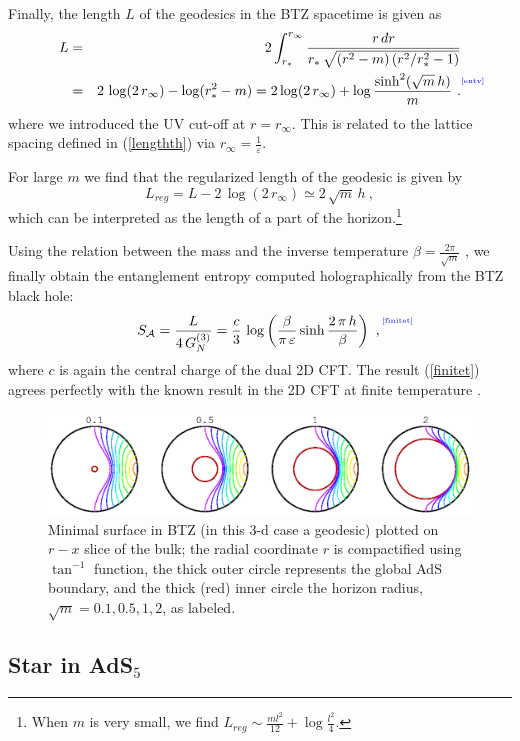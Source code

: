 \documentclass[12pt]{article}
\newcommand{\be}{\begin{equation}}
\newcommand{\ee}{\end{equation}}
\def\req#1{(\ref{#1})}
\def\veps{\varepsilon}
\def\s{\sigma}
\def\CA{{\cal A}}
\def\f#1#2{{\frac{#1}{#2}}}
\def\f#1#2{{\frac{#1}{#2}}}
\def\Label#1{\label{#1}%
{ \color{blue}{\smash{\hbox to0pt{\raise2ex\hbox{\tiny[#1]}\hss}}}}}
\def\rA{\CA}
\def\cof{{\veps}}
\def\s{\sqrt}
\def\f {\frac}
\def\no{\nonumber \\}
\def\ba{\begin{eqnarray}}
\def\ea{\end{eqnarray}}
\begin{document}
Finally, the length $L$ of the geodesics in the BTZ spacetime is given as
%
 \ba
L&=&2\int^{r_{\infty}}_{r_*}\f{r\, dr}{r_*\, \s{(r^2-m)\, (r^2/r^2_{*}-1)}}
\no
&=&2 \, \log(2\, r_\infty)
-\log(r^2_*-m) =2\log(2\, r_\infty)+\log\f{\sinh^2(\s{m}\, h)}{m} \ .
\Label{entv} \ea
%
where we introduced the UV cut-off at $r=r_{\infty}$. This is related to the lattice spacing defined in \req{lengthth} via $r_{\infty}=\f{1}{\cof}$.

For large $m$ we find that the regularized length of the geodesic is given by
%
\be
L_{reg}=  L-2\, \log(2\, r_\infty)\simeq
2\, \s{m}\, h \ ,\ee
%
which can be interpreted as the  length of a part of the
horizon.\footnote{When $m$ is very small, we find $L_{reg}\sim
\f{ml^2}{12}+\log\f{l^2}{4}$.}


Using the relation between the mass and the inverse
temperature $\beta=\f{2\pi}{\s{m}}$
\cite{Banados:1992wn,Aharony:1999ti},
we finally obtain the entanglement entropy
computed holographically \cite{Ryu:2006bv, Ryu:2006ef} from the BTZ
black hole:
%
 \be S_\rA =\f{L}{4\, G^{(3)}_N}=
\f{c}{3}\, \log\left(\f{\beta}{\pi\, \cof}\sinh\f{2\, \pi\,  h}{\beta}\right) \ ,
\Label{finitet} \ee
%
where $c$ is again the central charge of the
dual 2D CFT. The result \req{finitet} agrees perfectly with the
known result in the 2D CFT at finite temperature \cite{Calabrese:2004eu}.

\begin{figure}[htbp]
\begin{center}
\includegraphics[width=6.5in]{mp_BTZ_geodsA}
\caption{Minimal surface in BTZ (in this 3-d case a geodesic)
plotted on $r -x$ slice of the bulk; the radial
 coordinate $r$ is compactified using $\tan^{-1}$ function,
 the thick outer circle represents the global AdS boundary,
 and the thick (red) inner circle the horizon radius,
  $\s{m} = 0.1,0.5,1,2$, as labeled.} \label{mpBTZgeodsA}
\end{center}
\end{figure}




\subsection{Star in AdS$_5$}
\end{document}
